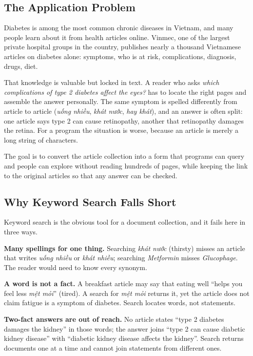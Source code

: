 \documentclass[11pt, a4paper]{article}
\begin{document}
\subsection{The Application Problem}

Diabetes is among the most common chronic diseases in Vietnam, and many people learn about it from health articles online. Vinmec, one of the largest private hospital groups in the country, publishes nearly a thousand Vietnamese articles on diabetes alone: symptoms, who is at risk, complications, diagnosis, drugs, diet.

That knowledge is valuable but locked in text. A reader who asks \emph{which complications of type 2 diabetes affect the eyes?} has to locate the right pages and assemble the answer personally. The same symptom is spelled differently from article to article (\emph{uống nhiều}, \emph{khát nước}, \emph{hay khát}), and an answer is often split: one article says type 2 can cause retinopathy, another that retinopathy damages the retina. For a program the situation is worse, because an article is merely a long string of characters.

The goal is to convert the article collection into a form that programs can query and people can explore without reading hundreds of pages, while keeping the link to the original articles so that any answer can be checked.

\subsection{Why Keyword Search Falls Short}

Keyword search is the obvious tool for a document collection, and it fails here in three ways.

\textbf{Many spellings for one thing.} Searching \emph{khát nước} (thirsty) misses an article that writes \emph{uống nhiều} or \emph{khát nhiều}; searching \emph{Metformin} misses \emph{Glucophage}. The reader would need to know every synonym.

\textbf{A word is not a fact.} A breakfast article may say that eating well ``helps you feel less \emph{mệt mỏi}'' (tired). A search for \emph{mệt mỏi} returns it, yet the article does not claim fatigue is a symptom of diabetes. Search locates words, not statements.

\textbf{Two-fact answers are out of reach.} No article states ``type 2 diabetes damages the kidney'' in those words; the answer joins ``type 2 can cause diabetic kidney disease'' with ``diabetic kidney disease affects the kidney''. Search returns documents one at a time and cannot join statements from different ones.
\end{document}
